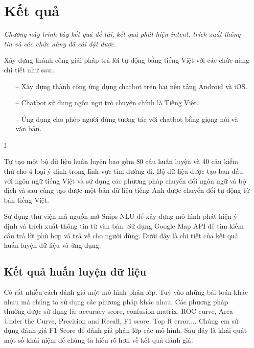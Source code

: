 \chapter{Kết quả}
\label{Chapter6}

\emph{Chương này trình bày kết quả đề tài, kết quả phát hiện intent, trích xuất thông tin và các chức năng đã cài đặt được.}


Xây dựng thành công giải pháp trả lời tự động bằng tiếng Việt với các chức năng chi tiết như sau:.
\begin{itemize}
    \item[--] Xây dựng thành công ứng dụng chatbot trên hai nền tảng Android và iOS.
    \item[--] Chatbot sử dụng ngôn ngữ trò chuyện chính là Tiếng Việt.
    \item[--] Ứng dụng cho phép người dùng tương tác với chatbot bằng giọng nói và văn bản.
\end{itemize}I

Tự tạo một bộ dữ liệu huấn luyện bao gồm 80 câu huấn luyện và 40 câu kiểm thử cho 4 loại ý định trong lĩnh vực tìm đường đi. Bộ dữ liệu được tạo ban đầu với ngôn ngữ tiếng Việt và sử dụng các phương pháp chuyển đổi ngôn ngữ và bộ dịch và sau cùng tạo được một bản dữ liệu tiếng Anh được chuyển đổi tự động từ bản tiếng Việt.  

Sử dụng thư viện mã nguồn mở Snips NLU\cite{Snipsnlu} để xây dựng mô hình phát hiện ý định và trích xuất thông tin từ văn bản. Sử dụng Google Map API\cite{ggmaps} để tìm kiếm câu trả lời phù hợp và trả về cho người dùng. Dưới đây là chi tiết của kết quả huấn luyện dữ liệu và ứng dụng.

\section{Kết quả huấn luyện dữ liệu}

Có rất nhiều cách đánh giá một mô hình phân lớp. Tuỳ vào những bài toán khác nhau mà chúng ta sử dụng các phương pháp khác nhau. Các phương pháp thường được sử dụng là: accuracy score, confusion matrix, ROC curve, Area Under the Curve, Precision and Recall, F1 score, Top R error,... Chúng em sử dụng đánh giá F1 Score để đánh giá phân lớp các mô hình. Sau đây là khái quát một số khái niệm để chúng ta hiểu rõ hơn về kết quả đánh giá.

